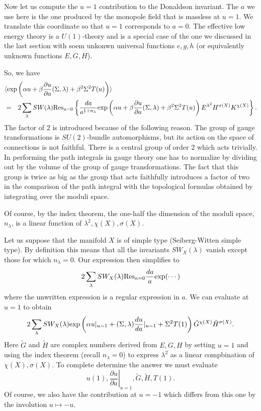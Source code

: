 \documentclass[10pt]{article}
\begin{document}
Now let us compute the $u=1$ contribution to the Donaldson invariant.
The $a$ we use here is the one produced by the monopole field that is
massless at $u=1$.  We translate this coordinate so that $u=1$
corresponds to $a=0$.
The effective low energy theory is a $U(1)$-theory and is a special
case of the one we discussed in the last section with soem unkonwn
universal functions $e,g,h$ (or equivalently unknown functions $E,G,H$).

So, we have
\begin{eqnarray*} \lefteqn{\langle {\rm exp}\left(\alpha u+\beta\frac{\partial
u}{\partial a}(\Sigma,\lambda)+\beta^2\Sigma^2 T(u)\right)\rangle} \\ 
& = & 2\sum_\lambda SW(\lambda){\rm
Res}_{a=0}\left\{\frac{da}{a^{1+n_\lambda}}{\rm exp}\left(\alpha
u+\beta\frac{\partial 
u}{\partial a}(\Sigma,\lambda)+\beta^2\Sigma^2T(u)\right)
E^{\lambda^2}H^{\sigma(X)}K^{\chi(X)}\right\}. 
\end{eqnarray*}
The factor of $2$ is introduced because of the following reason.
The group of gauge transformations is $SU(2)$-bundle automorphisms,
but its action on the space of connections is not faithful. There is a
central group of order $2$ which acts trivially.  In performing the
path integrals in gauge theory one has to normalize by dividing out by
the volume of the group of gauge transformations. The fact that this
group is twice as big as the group that acts faithfully introduces a
factor of two in the comparison of the path integral with the
topological formulas obtained by integrating over the moduli space.


Of course, by the index theorem, the one-half the dimension of the
moduli space, $n_\lambda$, is a linear function of
$\lambda^2,\chi(X),\sigma(X)$. 

Let us suppose that the manifold $X$ is of simple type (Seiberg-Witten
simple type). By definition this means that all the invariants
$SW_X(\lambda)$ vanish except those for which $n_\lambda=0$. 
Our expression then simplifies to 
$$2\sum_\lambda SW_X(\lambda){\rm Res}_{a=0} \frac{da}{a}{\rm
exp}(\cdots)$$ 
where the unwritten expression is a regular expression in $a$.
We can evaluate at $u=1$ to obtain
$$2\sum_\lambda SW_X(\lambda){\rm
exp}\left(\alpha
u|_{u=1}+(\Sigma,\lambda)\frac{du}{da}|_{u=1}+\Sigma^2T(1)\right) 
\tilde G^{\chi(X)} \tilde H^{\sigma(X)} .$$
Here $\tilde G$ and $\tilde H$ are complex numbers   derived from
$E,G,H$ by setting $u=1$ and using the index theorem (recall
$n_\lambda=0$)  to express $\lambda^2$ as a linear compbination of 
$\chi(X),\sigma(X)$.
To complete determine the answer we must evaluate
$$u(1),
\left.\frac{\partial u}{\partial a}\right|_{u=1}, \tilde G, \tilde H, T(1).$$
Of course, we also have the contribution at $u=-1$ which differs from
this one by the involution $u\mapsto -u$. 
\end{document}
